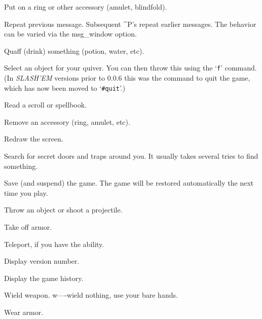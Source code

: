 \item[\tb{{\rm P}}]
Put on a ring or other accessory (amulet, blindfold).

\item[\tb{\^{}{\rm P}}]
Repeat previous message.  Subsequent \^{}P's repeat earlier messages.
The behavior can be varied via the msg\_window option.

\item[\tb{{\rm q}}]
Quaff (drink) something (potion, water, etc).

\item[\tb{{\rm Q}}]
Select an object for your quiver.  You can then throw this using
the `{\tt f}' command.  (In {\it SLASH'EM\/} versions prior to 0.0.6 this was the command
to quit the game, which has now been moved to `{\tt \#quit}'.)

\item[\tb{{\rm r}}]
Read a scroll or spellbook.

\item[\tb{{\rm R}}]
Remove an accessory (ring, amulet, etc).

\item[\tb{\^{}{\rm R}}]
Redraw the screen.

\item[\tb{{\rm s}}]
Search for secret doors and traps around you.  It usually takes several
tries to find something.

\item[\tb{{\rm S}}]
Save (and suspend) the game.  The game will be restored automatically the
next time you play.

\item[\tb{{\rm t}}]
Throw an object or shoot a projectile.

\item[\tb{{\rm T}}]
Take off armor.

\item[\tb{\^{}{\rm T}}]
Teleport, if you have the ability.

\item[\tb{{\rm v}}]
Display version number.

\item[\tb{{\rm V}}]
Display the game history.

\item[\tb{{\rm w}}]
Wield weapon.
w----wield nothing, use your bare hands.

\item[\tb{{\rm W}}]
Wear armor.

